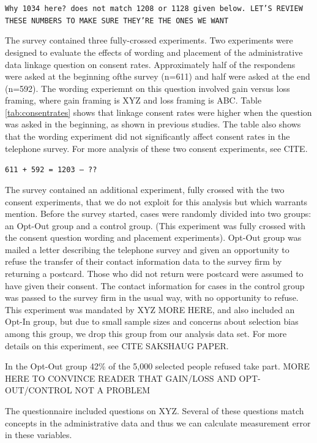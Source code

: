 \texttt{Why 1034 here? does not match 1208 or 1128 given below. LET'S REVIEW THESE NUMBERS TO MAKE SURE THEY'RE THE ONES WE WANT}

The survey contained three fully-crossed experiments. Two experiments were designed to evaluate the effects of wording and placement of the administrative data linkage question on consent rates. Approximately half of the respondens were asked at the beginning ofthe survey (n=611) and half were asked at the end (n=592). The wording experiemnt on this question involved gain versus loss framing, where gain framing is XYZ and loss framing is ABC. Table \ref{tab:consentrates} shows that linkage consent rates were higher when the question was asked in the beginning, as shown in previous studies. The table also shows that the wording experiment did not significantly affect consent rates in the telephone survey. For more analysis of these two consent experiments, see CITE.

\texttt{611 + 592 = 1203 -- ??}



The survey contained an additional experiment, fully crossed with the two consent experiments, that we do not exploit for this analysis but which warrants mention. Before the survey started, cases were randomly divided into two groups: an Opt-Out group and a control group. (This experiment was fully crossed with the consent question wording and placement experiments). Opt-Out group was mailed a letter describing the telephone survey and given an opportunity to refuse the transfer of their contact information data to the survey firm by returning a postcard. Those who did not return were postcard were assumed to have given their consent. The contact information for cases in the control group was passed to the survey firm in the usual way, with no opportunity to refuse. This experiment was mandated by XYZ MORE HERE, and also included an Opt-In group, but due to small sample sizes and concerns about selection bias among this group, we drop this group from  our analysis data set. For more details on this experiment, see CITE SAKSHAUG PAPER. 

In the Opt-Out group 42\% of the 5,000 selected people refused take part. MORE HERE TO CONVINCE READER THAT GAIN/LOSS AND OPT-OUT/CONTROL NOT A PROBLEM

The questionnaire included questions on XYZ. Several of these questions match concepts in the administrative data and thus we can calculate measurement error in these variables.

